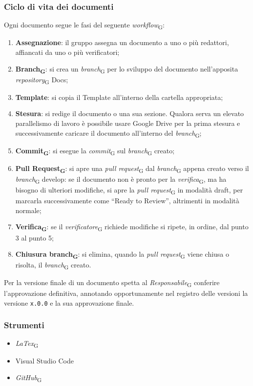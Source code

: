 \subsubsection{Ciclo di vita dei documenti}
Ogni documento segue le fasi del seguente \textit{workflow}\textsubscript{G}:
\begin{enumerate}
    \item \textbf{Assegnazione}: il gruppo assegna un documento a uno o più redattori, affiancati da uno o più verificatori;
    \item \textbf{Branch\textsubscript{G}}: si crea un \textit{branch}\textsubscript{G} per lo sviluppo del documento nell’apposita \textit{repository}\textsubscript{G} Docs;
    \item \textbf{Template}: si copia il Template all'interno della cartella appropriata;
    \item \textbf{Stesura}: si redige il documento o una sua sezione. Qualora serva un elevato parallelismo di lavoro è possibile usare Google Drive per la prima stesura e successivamente caricare il documento all’interno del \textit{branch}\textsubscript{G};
    \item \textbf{Commit\textsubscript{G}}: si esegue la \textit{commit}\textsubscript{G} sul \textit{branch}\textsubscript{G} creato;
    \item \textbf{Pull Request\textsubscript{G}}: si apre una \textit{pull request}\textsubscript{G} dal \textit{branch}\textsubscript{G} appena creato verso il \textit{branch}\textsubscript{G} develop: se il documento non è pronto per la \textit{verifica}\textsubscript{G}, ma ha bisogno di ulteriori modifiche, si apre la \textit{pull request}\textsubscript{G} in modalità draft, per marcarla successivamente come “Ready to Review”, altrimenti in modalità normale;
    \item \textbf{Verifica\textsubscript{G}}: se il \textit{verificatore}\textsubscript{G} richiede modifiche si ripete, in ordine, dal punto 3 al punto 5;
    \item \textbf{Chiusura branch\textsubscript{G}}: si elimina, quando la \textit{pull request}\textsubscript{G} viene chiusa o risolta, il \textit{branch}\textsubscript{G} creato.
\end{enumerate}
Per la versione finale di un documento spetta al \textit{Responsabile}\textsubscript{G} conferire l’approvazione definitiva, annotando opportunamente nel registro delle versioni la versione \texttt{x.0.0} e la sua approvazione finale.


\subsubsection{Strumenti}
\begin{itemize}
    \item \textit{LaTex}\textsubscript{G}
    \item Visual Studio Code
    \item \textit{GitHub}\textsubscript{G}
\end{itemize}
